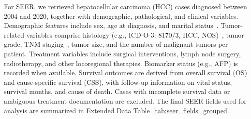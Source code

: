 \documentclass{article}
\begin{document}

For SEER, we retrieved hepatocellular carcinoma (HCC) cases diagnosed between 2004 and 2020, together with demographic, pathological, and clinical variables. Demographic features include sex, age at diagnosis, and marital status~\cite{usda_rucc2013}. Tumor-related variables comprise histology (e.g., ICD-O-3: 8170/3, HCC, NOS)~\cite{icdo3_who2013}, tumor grade, TNM staging~\cite{ajcc8_manual}, tumor size, and the number of malignant tumors per patient. Treatment variables include surgical interventions, lymph node surgery, radiotherapy, and other locoregional therapies. Biomarker status (e.g., AFP) is recorded when available. Survival outcomes are derived from overall survival (OS) and cause-specific survival (CSS), with follow-up information on vital status, survival months, and cause of death. Cases with incomplete survival data or ambiguous treatment documentation are excluded. The final SEER fields used for analysis are summarized in Extended Data Table~\ref{tab:seer_fields_grouped}.
\end{document}
